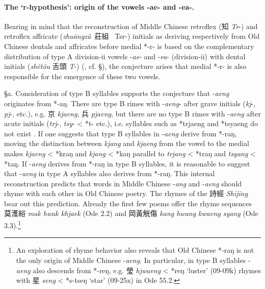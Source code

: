 \paragraph{The `r-hypothesis': origin of the
vowels -ae- and -ea-.} Bearing in mind that the reconstruction of
Middle Chinese retroflex (知 \emph{Tr}-) and retroflex affricate
(\emph{zhuāngzǔ~}莊組 \emph{~}Tsr-) initials as deriving respectively
from Old Chinese dentals and affricates before medial *-r- is based on
the complementary distribution of type A division-ii vowels -\emph{ae}-
and -\emph{ea}- (division-ii) with dental initials (\emph{shétóu} 舌頭
 \emph{T}-) (\cite[203-206]{Baxter1992}, cf. §), the conjecture arises that
medial *-r- is also responsible for the emergence of these two vowels.

§a. Consideration of type B syllables supports the conjecture that
-\emph{aeng} originates from *‑aŋ. There are type B rimes with
-\emph{aeng}- after grave initials (\emph{kj}-,  \emph{pj}-, etc.), e.g.
京  \emph{kjaeng}, 兵  \emph{pjaeng}, but there are no type B rimes with
-\emph{aeng} after acute initials (\emph{trj}-,  \emph{tsy}- \textless{}
*t- etc.), i.e. syllables such as *trjaeng and *tsyaeng do not exist
\citep[272]{Baxter1992}. If one suggests that type B syllables in
-\emph{aeng} derive from *-raŋ, moving the distinction between
 \emph{kjang} and \emph{kjaeng} from the vowel to the medial makes
 \emph{kjaeng} \textless{} *kraŋ and \emph{kjang} \textless{} *kaŋ
parallel to \emph{trjang} \textless{} *traŋ and \emph{tsyang}
\textless{} *taŋ. If -\emph{aeng} derives from *-raŋ in type B
syllables, it is reasonable to suggest that -\emph{aeng} in type A
syllables also derives from *-raŋ. This internal reconstruction predicts
that words in Middle Chinese -\emph{ang} and -\emph{aeng} should rhyme
with each other in Old Chinese poetry. The rhymes of the 詩經
 \emph{Shījīng} bear out this prediction. Already the first few poems
offer the rhyme sequences 莫濩綌 \emph{mak hwak khjaek} (Ode 2.2) and
岡黃觥傷 \emph{kang hwang kwaeng syang} (Ode 3.3).\footnote{An
  exploration of rhyme behavior also reveals that Old Chinese *-raŋ is
  not the only origin of Middle Chinese -\emph{aeng}. In particular, in
  type B syllables -\emph{aeng} also descends from *-reŋ, e.g. 瑩
   \emph{hjwaeng} \textless{} *{}reŋ `luster' (09-09k) rhymes with
  星  \emph{seng} \textless{} *s-ts{}{}eŋ `star' (09-25x) in Ode 55.2.}

